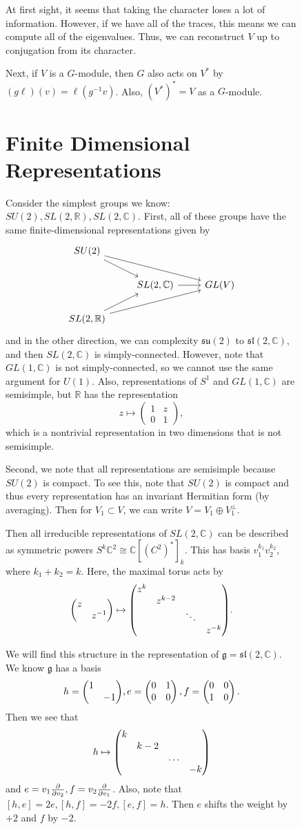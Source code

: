 \documentclass[leqno, openany]{memoir}
\theoremstyle{definition}
\theoremstyle{remark}
\theoremstyle{plain}
\theoremstyle{definition}
\theoremstyle{remark}
\newcommand{\R}{\mathbb{R}}
\newcommand{\C}{\mathbb{C}}
\newcommand{\mf}[1]{\mathfrak{#1}}
\begin{document}
\begin{figure}[H]
At first sight, it seems that taking the character loses a lot of information.
However, if we have all of the traces, this means we can compute all of the
eigenvalues. Thus, we can reconstruct $V$ up to conjugation from its character.

Next, if $V$ is a $G$-module, then $G$ also acts on $V^*$ by $(g\ell)(v) =
\ell(g^{-1} v)$. Also, $(V^*)^* = V$ as a $G$-module.

\section{Finite Dimensional Representations}%
\label{sec:finite_dimensional_representations}

Consider the simplest groups we know: $SU(2), SL(2, \R), SL(2, \C)$. First, all
of these groups have the same finite-dimensional representations given by
\begin{equation*} \begin{tikzcd} SU(2) \arrow{dr} \arrow{drr} \\ & SL(2, \C)
    \arrow{r} & GL(V) \\ SL(2, \R) \arrow{ur} \arrow{urr} \end{tikzcd}
\end{equation*} and in the other direction, we can complexity $\mf{su}(2)$ to
$\mf{sl}(2, \C)$, and then $SL(2, \C)$ is simply-connected. However, note that
$GL(1, \C)$ is not simply-connected, so we cannot use the same argument for
$U(1)$. Also, representations of $S^1$ and $GL(1, \C)$ are semisimple, but $\R$
has the representation \[ z \mapsto \begin{pmatrix} 1 & z \\ 0 & 1
\end{pmatrix}, \] which is a nontrivial representation in two dimensions that
is not semisimple.

Second, we note that all representations are semisimple because $SU(2)$ is
compact. To see this, note that $SU(2)$ is compact and thus every
representation has an invariant Hermitian form (by averaging). Then for $V_1
\subset V$, we can write $V = V_1 \oplus V_1^{\perp}$.

Then all irreducible representations of $SL(2, \C)$ can be described as
symmetric powers $S^k \C^2 \cong \C[(C^2)^*]_k$. This has basis $v_1^{k_1}
v_2^{k_2}$, where $k_1 + k_2 = k$. Here, the maximal torus acts by \[
\mqty(\dmat{z,z^{-1}}) \mapsto \mqty(\dmat{z^k, z^{k-2}, \ddots, z^{-k}}). \]

    We will find this structure in the representation of $\mf{g} = \mf{sl}(2,
    \C)$. We know $\mf{g}$ has a basis \[ h = \mqty(\dmat{1,-1}), e =
        \begin{pmatrix} 0 & 1 \\ 0 & 0 \end{pmatrix}, f = \begin{pmatrix} 0 & 0
    \\ 1 & 0 \end{pmatrix}. \] Then we see that \[ h \mapsto \mqty(\dmat{k,
k-2, \ldots, -k}) \] and $e = v_1 \pdv{v_2}, f = v_2 \pdv{v_1}$. Also, note
that $[h,e] = 2e, [h,f] = -2f, [e,f] = h$. Then $e$ shifts the weight by $+2$
and $f$ by $-2$.


\end{figure}
\end{document}
